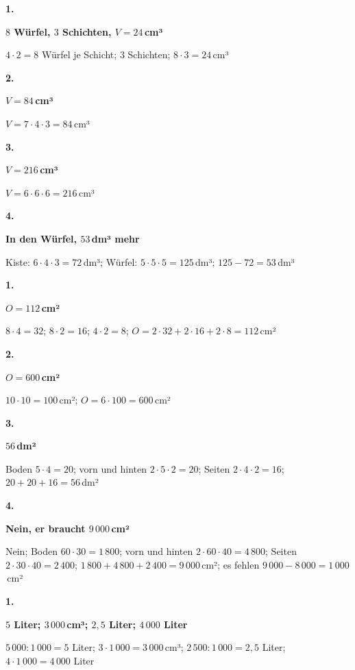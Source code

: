 \documentclass[11pt]{article}
\newcommand{\lsg}[3]{\par\noindent\begin{minipage}[t]{9mm}\textbf{#1}\end{minipage}%
  \begin{minipage}[t]{52mm}\raggedright\bfseries\boldmath #2\end{minipage}\hspace{3mm}%
  \begin{minipage}[t]{\dimexpr\linewidth-64mm\relax}\raggedright\small #3\end{minipage}\par\vspace{4pt}}
\begin{document}
\par\smallskip
{}\par
\par\Needspace{25mm}\vspace{6pt}\noindent\colorbox{black!12}{}\hspace{2mm}{\bfseries Volumen von Quader und Würfel}\par\vspace{4pt}
\lsg{1.}{$8$ Würfel, $3$ Schichten, $V = 24$\,cm³}{$4 \cdot 2 = 8$ Würfel je Schicht; $3$ Schichten; $8 \cdot 3 = 24$\,cm³}
\lsg{2.}{$V = 84$\,cm³}{$V = 7 \cdot 4 \cdot 3 = 84$\,cm³}
\lsg{3.}{$V = 216$\,cm³}{$V = 6 \cdot 6 \cdot 6 = 216$\,cm³}
\lsg{4.}{In den Würfel, $53$\,dm³ mehr}{Kiste: $6 \cdot 4 \cdot 3 = 72$\,dm³; Würfel: $5 \cdot 5 \cdot 5 = 125$\,dm³; $125 - 72 = 53$\,dm³}
\par\Needspace{25mm}\vspace{6pt}\noindent\colorbox{black!12}{}\hspace{2mm}{\bfseries Oberfläche}\par\vspace{4pt}
\lsg{1.}{$O = 112$\,cm²}{$8 \cdot 4 = 32$; $8 \cdot 2 = 16$; $4 \cdot 2 = 8$; $O = 2 \cdot 32 + 2 \cdot 16 + 2 \cdot 8 = 112$\,cm²}
\lsg{2.}{$O = 600$\,cm²}{$10 \cdot 10 = 100$\,cm²; $O = 6 \cdot 100 = 600$\,cm²}
\lsg{3.}{$56$\,dm²}{Boden $5 \cdot 4 = 20$; vorn und hinten $2 \cdot 5 \cdot 2 = 20$; Seiten $2 \cdot 4 \cdot 2 = 16$; $20 + 20 + 16 = 56$\,dm²}
\lsg{4.}{Nein, er braucht $9\,000$\,cm²}{Nein; Boden $60 \cdot 30 = 1\,800$; vorn und hinten $2 \cdot 60 \cdot 40 = 4\,800$; Seiten $2 \cdot 30 \cdot 40 = 2\,400$; $1\,800 + 4\,800 + 2\,400 = 9\,000$\,cm²; es fehlen $9\,000 - 8\,000 = 1\,000$\,cm²}
\par\Needspace{25mm}\vspace{6pt}\noindent\colorbox{black!12}{}\hspace{2mm}{\bfseries Liter und Kubikzentimeter}\par\vspace{4pt}
\lsg{1.}{$5$ Liter; $3\,000$\,cm³; $2{,}5$ Liter; $4\,000$ Liter}{$5\,000 : 1\,000 = 5$ Liter; $3 \cdot 1\,000 = 3\,000$\,cm³; $2\,500 : 1\,000 = 2{,}5$ Liter; $4 \cdot 1\,000 = 4\,000$ Liter}
\end{document}
